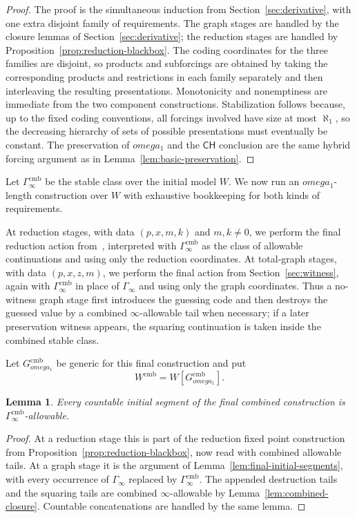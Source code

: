 \documentclass{article}
\newtheorem{lemma}[theorem]{Lemma}
\theoremstyle{remark}
\theoremstyle{plain}
\newcommand{\CH}{\mathsf{CH}}
\def\omega{omega}%
\begin{document}
\begin{proof}
The proof is the simultaneous induction from Section~\ref{sec:derivative}, with
one extra disjoint family of requirements. The graph stages are handled by the
closure lemmas of Section~\ref{sec:derivative}; the reduction stages are handled
by Proposition~\ref{prop:reduction-blackbox}. The coding coordinates for the
three families are disjoint, so products and subforcings are obtained by taking
the corresponding products and restrictions in each family separately and then
interleaving the resulting presentations. Monotonicity and nonemptiness are
immediate from the two component constructions. Stabilization follows because,
up to the fixed coding conventions, all forcings involved have size at most
$\aleph_1$, so the decreasing hierarchy of sets of possible presentations must
eventually be constant. The preservation of $\omega_1$ and the $\CH$ conclusion
are the same hybrid forcing argument as in Lemma~\ref{lem:basic-preservation}.
\end{proof}

Let $\Gamma^{\mathrm{cmb}}_\infty$ be the stable class over the initial model
$W$. We now run an $\omega_1$-length construction over $W$ with exhaustive
bookkeeping for both kinds of requirements.

At reduction stages, with data $(p,x,m,k)$ and $m,k\neq0$, we perform the final
reduction action from~\cite{HOFFELNER2023103292}, interpreted with
$\Gamma^{\mathrm{cmb}}_\infty$ as the class of allowable continuations and using
only the reduction coordinates. At total-graph stages, with data $(p,x,z,m)$,
we perform the final action from Section~\ref{sec:witness}, again with
$\Gamma^{\mathrm{cmb}}_\infty$ in place of $\Gamma_\infty$ and using only the
graph coordinates. Thus a no-witness graph stage first introduces the guessing
code and then destroys the guessed value by a combined $\infty$-allowable tail
when necessary; if a later preservation witness appears, the squaring
continuation is taken inside the combined stable class.

Let $G^{\mathrm{cmb}}_{\omega_1}$ be generic for this final construction and put
\[
   W^{\mathrm{cmb}}=W[G^{\mathrm{cmb}}_{\omega_1}].
\]

\begin{lemma}\label{lem:combined-initial-segments}
Every countable initial segment of the final combined construction is
$\Gamma^{\mathrm{cmb}}_\infty$-allowable.
\end{lemma}

\begin{proof}
At a reduction stage this is part of the reduction fixed point construction from
Proposition~\ref{prop:reduction-blackbox}, now read with combined allowable
tails. At a graph stage it is the argument of Lemma~\ref{lem:final-initial-segments},
with every occurrence of $\Gamma_\infty$ replaced by
$\Gamma^{\mathrm{cmb}}_\infty$. The appended destruction tails and the squaring
tails are combined $\infty$-allowable by Lemma~\ref{lem:combined-closure}.
Countable concatenations are handled by the same lemma.
\end{proof}
\end{document}
